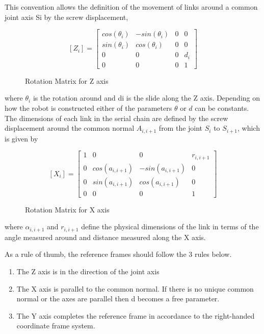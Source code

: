             This convention allows the definition of the movement of links around a common joint axis Si by the screw displacement,
            \begin{figure}[H]
                \centering
                $$
                [Z_i] = \begin{bmatrix}
                    cos(\theta_i) & -sin(\theta_i) & 0 & 0 \\
                    sin(\theta_i) & cos(\theta_i) & 0 & 0 \\
                    0 & 0 & 0 & d_i \\
                    0 & 0 & 0 & 1
                \end{bmatrix}
                $$
                \caption{Rotation Matrix for Z axis}
                \label{fig:RotationMatrixZAxis}
            \end{figure}
            where $\theta_i$ is the rotation around and di is the slide along the Z axis. Depending on how the robot is constructed either of the parameters $\theta$ or $d$ can be constants. The dimensions of each link in the serial chain are defined by the screw displacement around the common normal $A_{i,i+1}$ from the joint $S_i$ to $S_{i+1}$, which is given by
            \begin{figure}[H]
                \centering
                $$
                [X_i] = \begin{bmatrix}
                    1 & 0 & 0 & r_{i, i+1} \\
                    0 & cos(a_{i, i+1 }) & -sin(a_{i, i+1}) & 0 \\
                    0 & sin(a_{i, i+1}) & cos(a_{i, i+1}) & 0 \\
                    0 & 0 & 0 & 1
                \end{bmatrix}
                $$
                \caption{Rotation Matrix for X axis}
                \label{fig:RotationMatrixXAxis}
            \end{figure}
            where $\alpha_{i, i+1}$ and $r_{i,i+1}$ define the physical dimensions of the link in terms of the angle measured around and distance measured along the X axis. 
            
            As a rule of thumb, the reference frames should follow the 3 rules below.
            \begin{enumerate}
                \item The Z axis is in the direction of the joint axis
                \item The X axis is parallel to the common normal. If there is no unique common normal or the axes are parallel then d becomes a free parameter.
                \item The Y axis completes the reference frame in accordance to the right-handed coordinate frame system.
            \end{enumerate}
            
